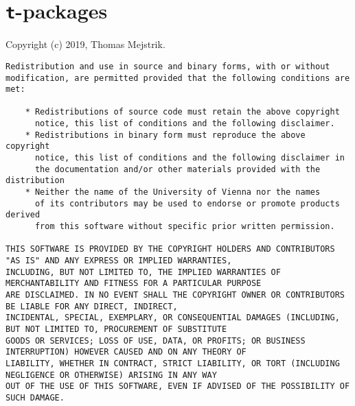 \section{\texttt{t}-packages}\label{licence_tpackages}
Copyright (c) 2019, Thomas Mejstrik.

{\footnotesize
\begin{verbatim}
Redistribution and use in source and binary forms, with or without
modification, are permitted provided that the following conditions are
met:

    * Redistributions of source code must retain the above copyright
      notice, this list of conditions and the following disclaimer.
    * Redistributions in binary form must reproduce the above copyright
      notice, this list of conditions and the following disclaimer in
      the documentation and/or other materials provided with the distribution
    * Neither the name of the University of Vienna nor the names
      of its contributors may be used to endorse or promote products derived
      from this software without specific prior written permission.

THIS SOFTWARE IS PROVIDED BY THE COPYRIGHT HOLDERS AND CONTRIBUTORS "AS IS" AND ANY EXPRESS OR IMPLIED WARRANTIES,
INCLUDING, BUT NOT LIMITED TO, THE IMPLIED WARRANTIES OF MERCHANTABILITY AND FITNESS FOR A PARTICULAR PURPOSE
ARE DISCLAIMED. IN NO EVENT SHALL THE COPYRIGHT OWNER OR CONTRIBUTORS BE LIABLE FOR ANY DIRECT, INDIRECT, 
INCIDENTAL, SPECIAL, EXEMPLARY, OR CONSEQUENTIAL DAMAGES (INCLUDING, BUT NOT LIMITED TO, PROCUREMENT OF SUBSTITUTE 
GOODS OR SERVICES; LOSS OF USE, DATA, OR PROFITS; OR BUSINESS INTERRUPTION) HOWEVER CAUSED AND ON ANY THEORY OF 
LIABILITY, WHETHER IN CONTRACT, STRICT LIABILITY, OR TORT (INCLUDING NEGLIGENCE OR OTHERWISE) ARISING IN ANY WAY 
OUT OF THE USE OF THIS SOFTWARE, EVEN IF ADVISED OF THE POSSIBILITY OF SUCH DAMAGE.
\end{verbatim}
}


